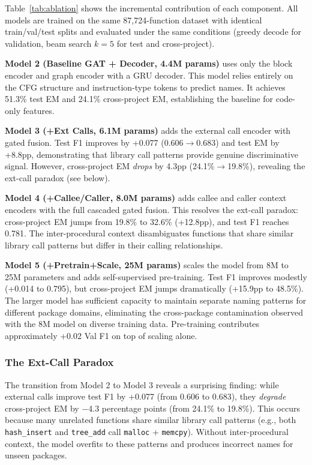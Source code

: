 \documentclass[sigconf,nonacm]{acmart}
\begin{document}
Table~\ref{tab:ablation} shows the incremental contribution of each component. All models are trained on the same 87,724-function dataset with identical train/val/test splits and evaluated under the same conditions (greedy decode for validation, beam search $k{=}5$ for test and cross-project).

\textbf{Model 2 (Baseline GAT + Decoder, 4.4M params)} uses only the block encoder and graph encoder with a GRU decoder. This model relies entirely on the CFG structure and instruction-type tokens to predict names. It achieves 51.3\% test EM and 24.1\% cross-project EM, establishing the baseline for code-only features.

\textbf{Model 3 (+Ext Calls, 6.1M params)} adds the external call encoder with gated fusion. Test F1 improves by +0.077 (0.606$\to$0.683) and test EM by +8.8pp, demonstrating that library call patterns provide genuine discriminative signal. However, cross-project EM \emph{drops} by 4.3pp (24.1\%$\to$19.8\%), revealing the ext-call paradox (see below).

\textbf{Model 4 (+Callee/Caller, 8.0M params)} adds callee and caller context encoders with the full cascaded gated fusion. This resolves the ext-call paradox: cross-project EM jumps from 19.8\% to 32.6\% (+12.8pp), and test F1 reaches 0.781. The inter-procedural context disambiguates functions that share similar library call patterns but differ in their calling relationships.

\textbf{Model 5 (+Pretrain+Scale, 25M params)} scales the model from 8M to 25M parameters and adds self-supervised pre-training. Test F1 improves modestly (+0.014 to 0.795), but cross-project EM jumps dramatically (+15.9pp to 48.5\%). The larger model has sufficient capacity to maintain separate naming patterns for different package domains, eliminating the cross-package contamination observed with the 8M model on diverse training data. Pre-training contributes approximately +0.02 Val F1 on top of scaling alone.

\subsubsection{The Ext-Call Paradox}
The transition from Model 2 to Model 3 reveals a surprising finding: while external calls improve test F1 by +0.077 (from 0.606 to 0.683), they \emph{degrade} cross-project EM by $-$4.3 percentage points (from 24.1\% to 19.8\%). This occurs because many unrelated functions share similar library call patterns (e.g., both \texttt{hash\_insert} and \texttt{tree\_add} call \texttt{malloc} + \texttt{memcpy}). Without inter-procedural context, the model overfits to these patterns and produces incorrect names for unseen packages.
\end{document}
